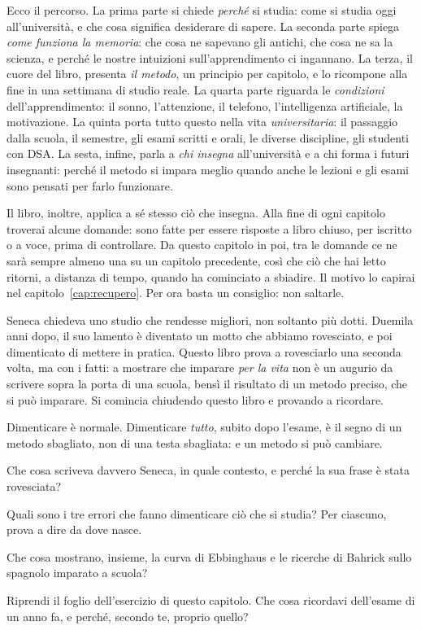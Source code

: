 Ecco il percorso. La prima parte si chiede \emph{perché} si studia:
come si studia oggi all'università, e che cosa significa desiderare di
sapere. La seconda parte spiega \emph{come funziona la memoria}: che
cosa ne sapevano gli antichi, che cosa ne sa la scienza, e perché le
nostre intuizioni sull'apprendimento ci ingannano. La terza, il cuore
del libro, presenta \emph{il metodo}, un principio per capitolo, e lo
ricompone alla fine in una settimana di studio reale. La quarta parte
riguarda le \emph{condizioni} dell'apprendimento: il sonno, l'attenzione,
il telefono, l'intelligenza artificiale, la motivazione. La quinta porta
tutto questo nella vita \emph{universitaria}: il passaggio dalla scuola,
il semestre, gli esami scritti e orali, le diverse discipline, gli
studenti con DSA. La sesta, infine, parla a \emph{chi insegna}
all'università e a chi forma i futuri insegnanti: perché il metodo si
impara meglio quando anche le lezioni e gli esami sono pensati per farlo
funzionare.

Il libro, inoltre, applica a sé stesso ciò che insegna. Alla fine di ogni
capitolo troverai alcune domande: sono fatte per essere risposte a
libro chiuso, per iscritto o a voce, prima di controllare. Da questo
capitolo in poi, tra le domande ce ne sarà sempre almeno una su un
capitolo precedente, così che ciò che hai letto ritorni, a distanza di
tempo, quando ha cominciato a sbiadire. Il motivo lo capirai nel
capitolo~\ref{cap:recupero}. Per ora basta un consiglio: non saltarle.

\asterismo

Seneca chiedeva uno studio che rendesse migliori, non soltanto più
dotti. Duemila anni dopo, il suo lamento è diventato un motto che
abbiamo rovesciato, e poi dimenticato di mettere in pratica. Questo
libro prova a rovesciarlo una seconda volta, ma con i fatti: a mostrare
che imparare \emph{per la vita} non è un augurio da scrivere sopra la
porta di una scuola, bensì il risultato di un metodo preciso, che si
può imparare. Si comincia chiudendo questo libro e provando a ricordare.

\begin{daricordare}
Dimenticare è normale. Dimenticare \emph{tutto}, subito dopo l'esame, è
il segno di un metodo sbagliato, non di una testa sbagliata: e un metodo
si può cambiare.
\end{daricordare}

\begin{domande}
  \item Che cosa scriveva davvero Seneca, in quale contesto, e perché la
        sua frase è stata rovesciata?
  \item Quali sono i tre errori che fanno dimenticare ciò che si
        studia? Per ciascuno, prova a dire da dove nasce.
  \item Che cosa mostrano, insieme, la curva di Ebbinghaus e le
        ricerche di Bahrick sullo spagnolo imparato a scuola?
  \item Riprendi il foglio dell'esercizio di questo capitolo. Che cosa
        ricordavi dell'esame di un anno fa, e perché, secondo te,
        proprio quello?
\end{domande}

